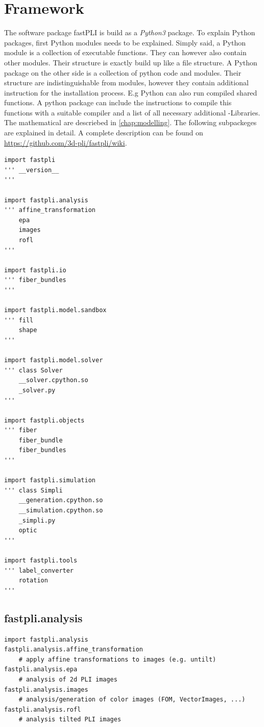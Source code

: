 \section{Framework}
The software package \ac{fastPLI} \cite{fastpli} is build as a \textit{Python3} \cite{Python3} package.
% 
To explain Python packages, first Python modules needs to be explained.
% 
Simply said, a Python module is a collection of executable functions.
They can however also contain other modules.
Their structure is exactly build up like a file structure. 
% 
A Python package on the other side is a collection of python code and modules.
Their structure are indistinguishable from modules, however they contain additional instruction for the installation process.
E.g Python can also run compiled shared \CCXX{} functions.
A python package can include the instructions to compile this functions with a suitable \CCXX{} compiler and a list of all necessary additional \CCXX{}-Libraries.
\\
% 
The mathematical \dummy are descriebed in \cref{chap:modelling}.
The following subpackeges are explained in detail.
A complete description can be found on \url{https://github.com/3d-pli/fastpli/wiki}.
% 
\begin{lstfloat}[!t]
\lstset{style=python}
\begin{lstlisting}
import fastpli
''' __version__
'''

import fastpli.analysis
''' affine_transformation
    epa
    images
    rofl
'''

import fastpli.io
''' fiber_bundles
'''

import fastpli.model.sandbox
''' fill
    shape
'''

import fastpli.model.solver
''' class Solver
    __solver.cpython.so
    _solver.py
'''

import fastpli.objects
''' fiber
    fiber_bundle
    fiber_bundles
'''

import fastpli.simulation
''' class Simpli
    __generation.cpython.so
    __simulation.cpython.so
    _simpli.py
    optic
'''

import fastpli.tools
''' label_converter
    rotation
'''
\end{lstlisting}
\caption[Overview \fastpli package]{Overview \fastpli package with containing modules}
\end{lstfloat}
% 
\subsection{fastpli.analysis}
\begin{lstfloat}[!t]
\lstset{style=python}
\begin{lstlisting}
import fastpli.analysis
fastpli.analysis.affine_transformation
    # apply affine transformations to images (e.g. untilt)
fastpli.analysis.epa
    # analysis of 2d PLI images
fastpli.analysis.images
    # analysis/generation of color images (FOM, VectorImages, ...)
fastpli.analysis.rofl
    # analysis tilted PLI images
\end{lstlisting}
\caption{\texttt{fastpli.analysis}}
\end{lstfloat}
% 
